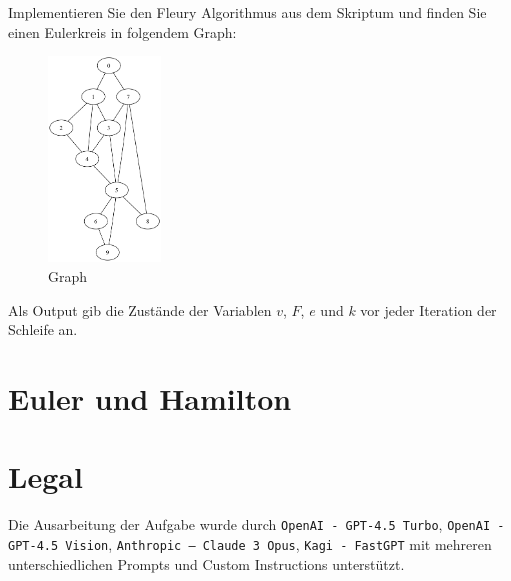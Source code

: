 \documentclass[a4paper,11pt]{report}
\begin{document}
Implementieren Sie den Fleury Algorithmus aus dem Skriptum und finden Sie einen Eulerkreis in folgendem Graph:
\begin{figure}[htbp]
    \centering
    \includegraphics[width=3cm]{notebook/assets/aufgabe_07_graph.png}
    \caption{Graph}
    \label{fig:eulerkreis_graph}
\end{figure}

Als Output gib die Zustände der Variablen $v$, $F$, $e$ und $k$ vor jeder Iteration der Schleife an.

\newpage

\chapter{Euler und Hamilton}



\newpage

\chapter{Legal}
Die Ausarbeitung der Aufgabe wurde durch \texttt{OpenAI - GPT-4.5 Turbo}, \texttt{OpenAI - GPT-4.5 Vision}, \texttt{Anthropic -- Claude 3 Opus},  \texttt{Kagi - FastGPT} mit mehreren unterschiedlichen Prompts und Custom Instructions unterstützt.
\end{document}
